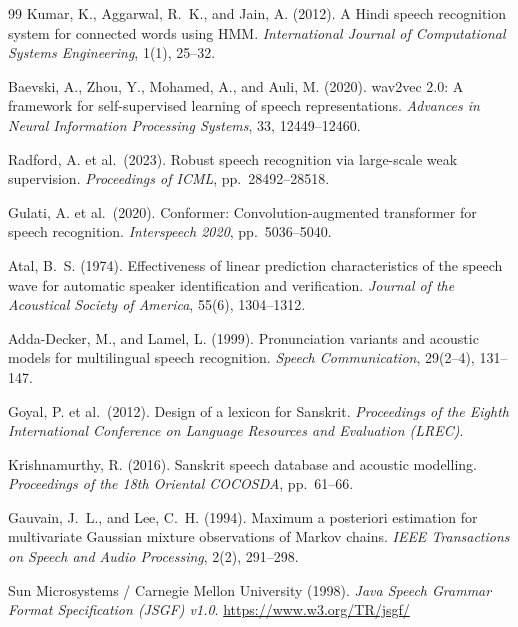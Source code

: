 \documentclass[12pt,a4paper]{article}
\begin{document}
\begin{thebibliography}{99}
Kumar, K., Aggarwal, R.~K., and Jain, A. (2012).
A Hindi speech recognition system for connected words using HMM.
\textit{International Journal of Computational Systems Engineering},
1(1), 25--32.

Baevski, A., Zhou, Y., Mohamed, A., and Auli, M. (2020).
wav2vec 2.0: A framework for self-supervised learning of speech representations.
\textit{Advances in Neural Information Processing Systems}, 33, 12449--12460.

Radford, A. et al.\ (2023).
Robust speech recognition via large-scale weak supervision.
\textit{Proceedings of ICML}, pp.~28492--28518.

Gulati, A. et al.\ (2020).
Conformer: Convolution-augmented transformer for speech recognition.
\textit{Interspeech 2020}, pp.~5036--5040.

Atal, B.~S. (1974).
Effectiveness of linear prediction characteristics of the speech wave
for automatic speaker identification and verification.
\textit{Journal of the Acoustical Society of America}, 55(6), 1304--1312.

Adda-Decker, M., and Lamel, L. (1999).
Pronunciation variants and acoustic models for multilingual speech recognition.
\textit{Speech Communication}, 29(2--4), 131--147.

Goyal, P. et al.\ (2012).
Design of a lexicon for Sanskrit.
\textit{Proceedings of the Eighth International Conference on Language
Resources and Evaluation (LREC)}.

Krishnamurthy, R. (2016).
Sanskrit speech database and acoustic modelling.
\textit{Proceedings of the 18th Oriental COCOSDA}, pp.\ 61--66.

Gauvain, J.~L., and Lee, C.~H. (1994).
Maximum a posteriori estimation for multivariate Gaussian mixture observations
of Markov chains.
\textit{IEEE Transactions on Speech and Audio Processing}, 2(2), 291--298.

Sun Microsystems / Carnegie Mellon University (1998).
\textit{Java Speech Grammar Format Specification (JSGF) v1.0}.
\url{https://www.w3.org/TR/jsgf/}

\end{thebibliography}
\end{document}

